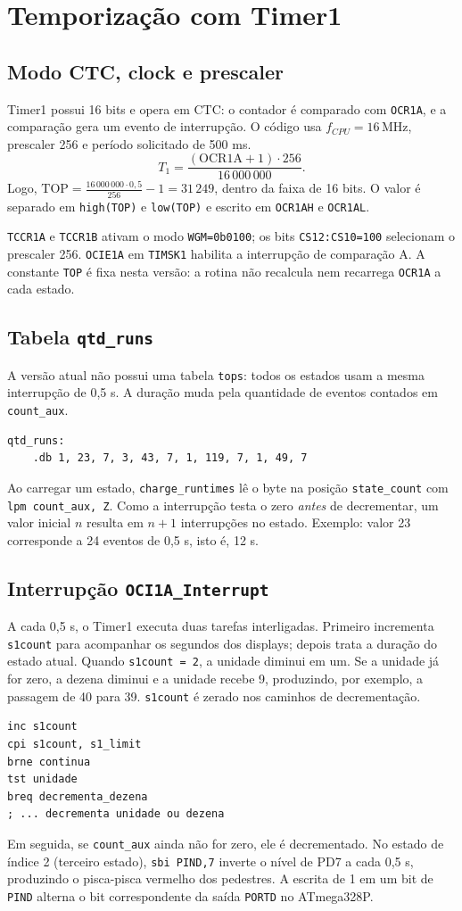 \documentclass[12pt,a4paper]{article}
\newcommand{\reg}[1]{\texttt{#1}}
\begin{document}
\section{Temporização com Timer1}
\subsection{Modo CTC, clock e prescaler}
Timer1 possui 16 bits e opera em CTC: o contador é comparado com \reg{OCR1A}, e a comparação gera um evento de interrupção. O código usa \(f_{CPU}=16\,\mathrm{MHz}\), prescaler 256 e período solicitado de 500 ms.
\[
T_1=\frac{(\mathrm{OCR1A}+1)\cdot 256}{16\,000\,000}.
\]
Logo, \(\mathrm{TOP}=\frac{16\,000\,000\cdot 0{,}5}{256}-1=31\,249\), dentro da faixa de 16 bits. O valor é separado em \reg{high(TOP)} e \reg{low(TOP)} e escrito em \reg{OCR1AH} e \reg{OCR1AL}.

\reg{TCCR1A} e \reg{TCCR1B} ativam o modo \reg{WGM=0b0100}; os bits \reg{CS12:CS10=100} selecionam o prescaler 256. \reg{OCIE1A} em \reg{TIMSK1} habilita a interrupção de comparação A. A constante \reg{TOP} é fixa nesta versão: a rotina não recalcula nem recarrega \reg{OCR1A} a cada estado.

\subsection{Tabela \texttt{qtd\_runs}}
A versão atual não possui uma tabela \reg{tops}: todos os estados usam a mesma interrupção de 0,5 s. A duração muda pela quantidade de eventos contados em \reg{count\_aux}.
\begin{lstlisting}
qtd_runs:
    .db 1, 23, 7, 3, 43, 7, 1, 119, 7, 1, 49, 7
\end{lstlisting}
Ao carregar um estado, \reg{charge\_runtimes} lê o byte na posição \reg{state\_count} com \reg{lpm count\_aux, Z}. Como a interrupção testa o zero \emph{antes} de decrementar, um valor inicial \(n\) resulta em \(n+1\) interrupções no estado. Exemplo: valor 23 corresponde a 24 eventos de 0,5 s, isto é, 12 s.

\subsection{Interrupção \texttt{OCI1A\_Interrupt}}
A cada 0,5 s, o Timer1 executa duas tarefas interligadas. Primeiro incrementa \reg{s1count} para acompanhar os segundos dos displays; depois trata a duração do estado atual. Quando \reg{s1count = 2}, a unidade diminui em um. Se a unidade já for zero, a dezena diminui e a unidade recebe 9, produzindo, por exemplo, a passagem de 40 para 39. \reg{s1count} é zerado nos caminhos de decrementação.
\begin{lstlisting}
inc s1count
cpi s1count, s1_limit
brne continua
tst unidade
breq decrementa_dezena
; ... decrementa unidade ou dezena
\end{lstlisting}
Em seguida, se \reg{count\_aux} ainda não for zero, ele é decrementado. No estado de índice 2 (terceiro estado), \reg{sbi PIND,7} inverte o nível de PD7 a cada 0,5 s, produzindo o pisca-pisca vermelho dos pedestres. A escrita de 1 em um bit de \reg{PIND} alterna o bit correspondente da saída \reg{PORTD} no ATmega328P.
\end{document}
